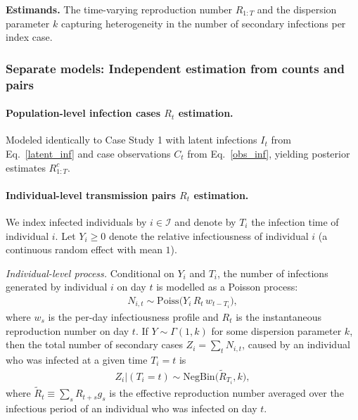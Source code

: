 \documentclass{article}
\begin{document}
\noindent\textbf{Estimands.} The time-varying reproduction number $R_{1:T}$ and the dispersion parameter $k$ capturing heterogeneity in the number of secondary infections per index case. 

\subsubsection{Separate models: Independent estimation from counts and pairs}

\paragraph{Population-level infection cases $R_t$ estimation.}
Modeled identically to Case Study 1 with latent infections $I_t$ from Eq.~\eqref{latent_inf} and case observations $C_t$ from  Eq.~\eqref{obs_inf}, yielding posterior estimates $R_{1:T}^c$.

\paragraph{Individual-level transmission pairs $R_t$ estimation.}
We index infected individuals by $i\in\mathcal{I}$ and denote by $T_i$ the infection time of individual $i$. Let $Y_i\ge0$ denote the relative infectiousness of individual $i$ (a continuous random effect with mean $1$).

\emph{Individual-level process.}  Conditional on $Y_i$ and $T_i$, the number of infections generated by individual $i$ on day $t$ is modelled as a Poisson process:
\begin{align}\label{cs3_ind_process}
N_{i,t} \sim \mathrm{Poiss}\!\big(Y_i\, R_t\, w_{t-T_i}\big), 
\end{align}
where $w_s$ is the per-day infectiousness profile and $R_t$ is the instantaneous reproduction number on day $t$. If $Y\sim \Gamma (1,k)$ for some dispersion parameter $k$, then the total  number of secondary cases $Z_i = \sum_{t} N_{i,t}$, caused by an individual who was infected at a given time $T_i=t$  is
\begin{align}\label{offspring_cases}
Z_i |(T_i=t)\sim \mathrm{NegBin}\!\Big(\tilde{R}_{T_i}, k\Big), 
\end{align}
where $\widetilde{R}_t \equiv \sum_{s} R_{t+s}g_s$ is the effective reproduction number averaged over the infectious period of an individual who was infected on day $t$.
\end{document}

